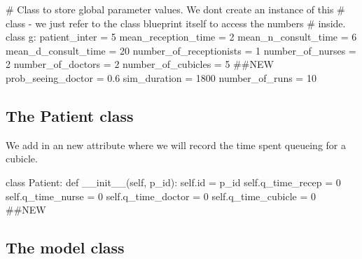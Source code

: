 \documentclass[
  letterpaper,
  DIV=11,
  numbers=noendperiod]{scrreprt}
\newenvironment{Shaded}{\begin{snugshade}}{\end{snugshade}}
\newcommand{\BuiltInTok}[1]{\textcolor[rgb]{0.00,0.23,0.31}{#1}}
\newcommand{\CommentTok}[1]{\textcolor[rgb]{0.37,0.37,0.37}{#1}}
\newcommand{\DecValTok}[1]{\textcolor[rgb]{0.68,0.00,0.00}{#1}}
\newcommand{\FloatTok}[1]{\textcolor[rgb]{0.68,0.00,0.00}{#1}}
\newcommand{\FunctionTok}[1]{\textcolor[rgb]{0.28,0.35,0.67}{#1}}
\newcommand{\KeywordTok}[1]{\textcolor[rgb]{0.00,0.23,0.31}{#1}}
\newcommand{\NormalTok}[1]{\textcolor[rgb]{0.00,0.23,0.31}{#1}}
\newcommand{\OperatorTok}[1]{\textcolor[rgb]{0.37,0.37,0.37}{#1}}
\newcommand{\VariableTok}[1]{\textcolor[rgb]{0.07,0.07,0.07}{#1}}
\begin{document}
\begin{Shaded}
\begin{Highlighting}[]
\CommentTok{\# Class to store global parameter values.  We don\textquotesingle{}t create an instance of this}
\CommentTok{\# class {-} we just refer to the class blueprint itself to access the numbers}
\CommentTok{\# inside.}
\KeywordTok{class}\NormalTok{ g:}
\NormalTok{    patient\_inter }\OperatorTok{=} \DecValTok{5}
\NormalTok{    mean\_reception\_time }\OperatorTok{=} \DecValTok{2}
\NormalTok{    mean\_n\_consult\_time }\OperatorTok{=} \DecValTok{6}
\NormalTok{    mean\_d\_consult\_time }\OperatorTok{=} \DecValTok{20}
\NormalTok{    number\_of\_receptionists }\OperatorTok{=} \DecValTok{1}
\NormalTok{    number\_of\_nurses }\OperatorTok{=} \DecValTok{2}
\NormalTok{    number\_of\_doctors }\OperatorTok{=} \DecValTok{2}
\NormalTok{    number\_of\_cubicles }\OperatorTok{=} \DecValTok{5} \CommentTok{\#\#NEW}
\NormalTok{    prob\_seeing\_doctor }\OperatorTok{=} \FloatTok{0.6}
\NormalTok{    sim\_duration }\OperatorTok{=} \DecValTok{1800}
\NormalTok{    number\_of\_runs }\OperatorTok{=} \DecValTok{10}
\end{Highlighting}
\end{Shaded}

\subsection{The Patient class}\label{the-patient-class-7}

We add in an new attribute where we will record the time spent queueing
for a cubicle.

\begin{Shaded}
\begin{Highlighting}[]
\KeywordTok{class}\NormalTok{ Patient:}
    \KeywordTok{def} \FunctionTok{\_\_init\_\_}\NormalTok{(}\VariableTok{self}\NormalTok{, p\_id):}
        \VariableTok{self}\NormalTok{.}\BuiltInTok{id} \OperatorTok{=}\NormalTok{ p\_id}
        \VariableTok{self}\NormalTok{.q\_time\_recep }\OperatorTok{=} \DecValTok{0}
        \VariableTok{self}\NormalTok{.q\_time\_nurse }\OperatorTok{=} \DecValTok{0}
        \VariableTok{self}\NormalTok{.q\_time\_doctor }\OperatorTok{=} \DecValTok{0}
        \VariableTok{self}\NormalTok{.q\_time\_cubicle }\OperatorTok{=} \DecValTok{0} \CommentTok{\#\#NEW}
\end{Highlighting}
\end{Shaded}

\subsection{The model class}\label{the-model-class-8}
\end{document}

